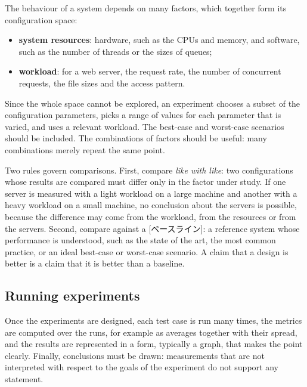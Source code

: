 \documentclass[../main.tex]{subfiles}
\begin{document}
The behaviour of a system depends on many factors, which together form its
configuration space:
\begin{itemize}
  \item \textbf{system resources}: hardware, such as the CPUs and memory,
    and software, such as the number of threads or the sizes of queues;
  \item \textbf{workload}: for a web server, the request rate, the number of
    concurrent requests, the file sizes and the access pattern.
\end{itemize}
Since the whole space cannot be explored, an experiment chooses a subset of
the configuration parameters, picks a range of values for each parameter
that is varied, and uses a relevant workload.  The best-case and worst-case
scenarios should be included.  The combinations of factors should be
useful: many combinations merely repeat the same point.

Two rules govern comparisons.  First, compare \emph{like with like}: two
configurations whose results are compared must differ only in the factor
under study.  If one server is measured with a light
workload on a large machine and another with a heavy workload on a small
machine, no conclusion about the servers is possible, because the difference
may come from the workload, from the resources or from the servers.
Second, compare against a [ベースライン]: a reference system
whose performance is understood, such as the state of the art, the most
common practice, or an ideal best-case or worst-case scenario.  A claim
that a design is better is a claim that it is better than a
baseline.

\subsection{Running experiments}

Once the experiments are designed, each test case is run many times, the
metrics are computed over the runs, for example as averages together with
their spread, and the results are represented in a form, typically a graph,
that makes the point clearly.  Finally, conclusions must be drawn:
measurements that are not interpreted with respect to the goals of the
experiment do not support any statement.
\end{document}
